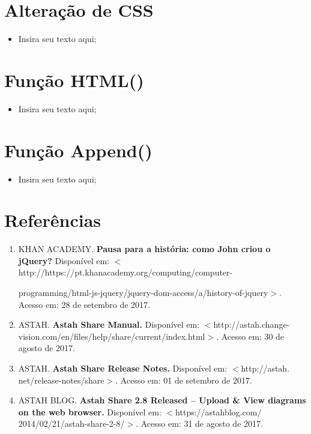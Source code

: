 \documentclass[12pt,a4paper]{article}
\begin{document}
\section{Alteração de CSS}%
\begin{itemize}

\item Insira seu texto aqui;
\end{itemize}

\section{Função HTML()}%
\begin{itemize}

\item Insira seu texto aqui;
\end{itemize}

\section{Função Append()}%
\begin{itemize}

\item Insira seu texto aqui;
\end{itemize}


\section{Referências}
\begin{enumerate}

\item KHAN ACADEMY. \textbf{Pausa para a história: como John criou o jQuery?} Disponível em: $<$http://https://pt.khanacademy.org/computing/computer-

programming/html-js-jquery/jquery-dom-access/a/history-of-jquery$>$. Acesso em: 28 de setembro de 2017.

\item ASTAH. \textbf{Astah Share Manual.} Disponível em: $<$http://astah.change-vision.com/en/files/help/share/current/index.html$>$. Acesso em: 30 de agosto de 2017.

\item ASTAH. \textbf{Astah Share Release Notes.} Disponível em: $<$http://astah.
net/release-notes/share$>$. Acesso em: 01 de setembro de 2017.

\item ASTAH BLOG. \textbf{Astah Share 2.8 Released – Upload \& View diagrams on the web browser.}  Disponível em: $<$https://astahblog.com/
2014/02/21/astah-share-2-8/$>$. Acesso em: 31 de agosto de 2017.

\end{enumerate}
\end{document}
